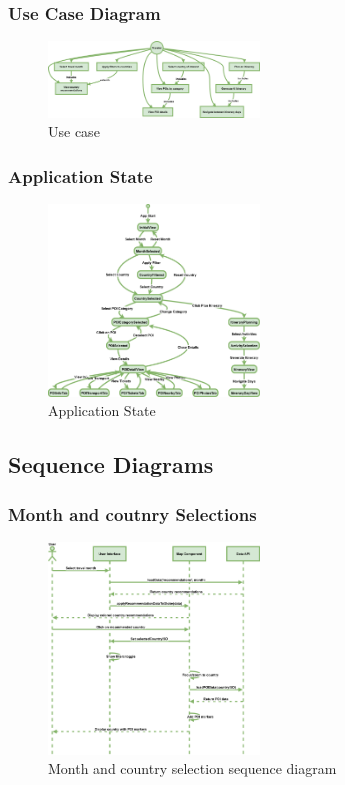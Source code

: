 \documentclass[]{project_final}
\begin{document}
\subsubsection{Use Case Diagram}

\begin{figure}[ht!]
  \centering
  \includegraphics[width=0.5\textwidth]{TPUseCase.png}
  \vspace*{0.0cm}
  \caption{Use case}
  \label{fig:1}
\end{figure}
\newpage
\subsubsection{Application State}

\begin{figure}[ht!]
  \centering
  \includegraphics[width=0.5\textwidth]{TPApplicationState.png}
  \vspace*{0.0cm}
  \caption{Application State}
  \label{fig:1}
\end{figure}
\newpage
\subsection{Sequence Diagrams}
\subsubsection{Month and coutnry Selections}

\begin{figure}[ht!]
  \centering
  \includegraphics[width=0.5\textwidth]{MonthandcountryselectionsSequence.png}
  \vspace*{0.0cm}
  \caption{Month and country selection sequence diagram}
  \label{fig:1}
\end{figure}
\newpage
\end{document}
